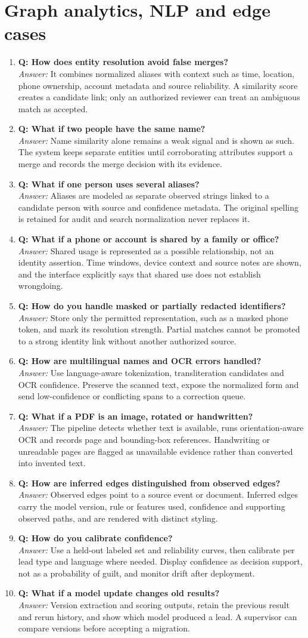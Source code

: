 \documentclass[10pt,a4paper]{article}
\newcommand{\qa}[2]{\item \textbf{\color{navy}Q: #1}\\[-1pt]{\color{coral}\textit{Answer:}} #2}
\begin{document}
\section{Graph analytics, NLP and edge cases}
\begin{enumerate}[resume]
\qa{How does entity resolution avoid false merges?}{It combines normalized aliases with context such as time, location, phone ownership, account metadata and source reliability. A similarity score creates a candidate link; only an authorized reviewer can treat an ambiguous match as accepted.}
\qa{What if two people have the same name?}{Name similarity alone remains a weak signal and is shown as such. The system keeps separate entities until corroborating attributes support a merge and records the merge decision with its evidence.}
\qa{What if one person uses several aliases?}{Aliases are modeled as separate observed strings linked to a candidate person with source and confidence metadata. The original spelling is retained for audit and search normalization never replaces it.}
\qa{What if a phone or account is shared by a family or office?}{Shared usage is represented as a possible relationship, not an identity assertion. Time windows, device context and source notes are shown, and the interface explicitly says that shared use does not establish wrongdoing.}
\qa{How do you handle masked or partially redacted identifiers?}{Store only the permitted representation, such as a masked phone token, and mark its resolution strength. Partial matches cannot be promoted to a strong identity link without another authorized source.}
\qa{How are multilingual names and OCR errors handled?}{Use language-aware tokenization, transliteration candidates and OCR confidence. Preserve the scanned text, expose the normalized form and send low-confidence or conflicting spans to a correction queue.}
\qa{What if a PDF is an image, rotated or handwritten?}{The pipeline detects whether text is available, runs orientation-aware OCR and records page and bounding-box references. Handwriting or unreadable pages are flagged as unavailable evidence rather than converted into invented text.}
\qa{How are inferred edges distinguished from observed edges?}{Observed edges point to a source event or document. Inferred edges carry the model version, rule or features used, confidence and supporting observed paths, and are rendered with distinct styling.}
\qa{How do you calibrate confidence?}{Use a held-out labeled set and reliability curves, then calibrate per lead type and language where needed. Display confidence as decision support, not as a probability of guilt, and monitor drift after deployment.}
\qa{What if a model update changes old results?}{Version extraction and scoring outputs, retain the previous result and rerun history, and show which model produced a lead. A supervisor can compare versions before accepting a migration.}
\end{enumerate}
\end{document}
